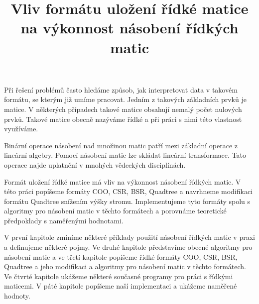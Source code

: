 \documentclass[thesis=B,czech]{FITthesis}[2012/06/26]
\title{Vliv formátu uložení řídké matice na výkonnost násobení řídkých matic}
\begin{document}

\begin{introduction}

Při řešení problémů často hledáme způsob, jak interpretovat data v takovém formátu, se kterým již umíme pracovat. Jedním z takových základních prvků je matice. V některých případech takové matice obsahují nemalý počet nulových prvků. Takové matice obecně nazýváme řídké a při práci s nimi této vlastnost využíváme.

Binární operace násobení nad množinou matic patří mezi základní operace z lineární algebry. Pomocí násobení matic lze skládat lineární transformace. Tato operace najde uplatnění v mnohých vědeckých disciplínách.

Formát uložení řídké matice má vliv na výkonnost násobení řídkých matic. V této práci popíšeme formáty COO, CSR, BSR, Quadtree a navrhneme modifikaci formátu Quadtree snížením výšky stromu. Implementujeme tyto formáty spolu s algoritmy pro násobení matic v těchto formátech a porovnáme teoretické předpoklady s naměřenými hodnotami.

V první kapitole zmíníme některé příklady použití násobení řídkých matic v praxi a definujeme některé pojmy. Ve druhé kapitole představíme obecné algoritmy pro násobení matic a ve třetí kapitole popíšeme řídké formáty COO, CSR, BSR, Quadtree a jeho modifikaci a algoritmy pro násobení matic v těchto formátech. Ve čtvrté kapitole ukážeme některé současné programy pro práci s řídkými maticemi. V páté kapitole popíšeme naší implementaci a ukážeme naměřené hodnoty.

\end{introduction}

\end{document}
